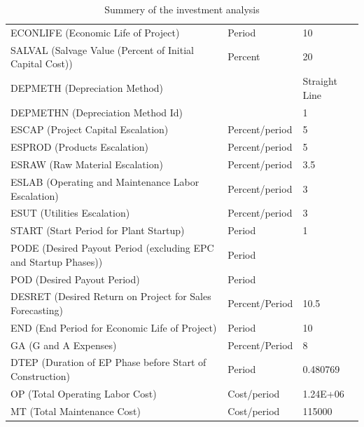 \begin{enumerate}[label=\textbf{Step \arabic{enumi}}:,ref=Step \arabic{enumi}]
\begin{table}[h!]
{\begin{tabular}{l|ll}
			ECONLIFE    (Economic Life of Project)                             & Period         & 10            \\
			SALVAL    (Salvage Value (Percent of Initial Capital Cost))        & Percent        & 20            \\
			DEPMETH    (Depreciation Method)                                   &                & Straight Line \\
			DEPMETHN    (Depreciation Method Id)                               &                & 1             \\
			ESCAP    (Project Capital Escalation)                              & Percent/period & 5             \\
			ESPROD    (Products Escalation)                                    & Percent/period & 5             \\
			ESRAW    (Raw Material Escalation)                                 & Percent/period & 3.5           \\
			ESLAB    (Operating and Maintenance Labor Escalation)              & Percent/period & 3             \\
			ESUT    (Utilities Escalation)                                     & Percent/period & 3             \\
			START    (Start Period for Plant Startup)                          & Period         & 1             \\
			PODE    (Desired Payout Period (excluding EPC and Startup Phases)) & Period         &               \\
			POD    (Desired Payout Period)                                     & Period         &               \\
			DESRET    (Desired Return on Project for Sales Forecasting)        & Percent/Period & 10.5          \\
			END    (End Period for Economic Life of Project)                   & Period         & 10            \\
			GA    (G and A Expenses)                                           & Percent/Period & 8             \\
			DTEP    (Duration of EP Phase before Start of Construction)        & Period         & 0.480769      \\
			OP    (Total Operating Labor Cost)                                 & Cost/period    & 1.24E+06      \\
			MT    (Total Maintenance Cost)                                     & Cost/period    & 115000       \\ \hline
		\end{tabular} }
	\caption{Summery of the investment analysis}
	\label{tab:AceticInvestment}
	\end{table}
		

\end{enumerate}
